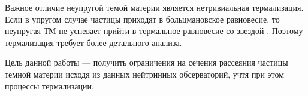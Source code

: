 Важное отличие неупругой темой материи является нетривиальная термализация. Если в упругом случае частицы приходят в больцмановское равновесие, то неупругая ТМ не успевает прийти в термальное равновесие со звездой \cite{Blennow_2018}. Поэтому термализация требует более детального анализа.

Цель данной работы --- получить ограничения на сечения рассеяния частицы темной материи исходя из данных нейтринных обсерваторий, учтя при этом процессы термализации.


